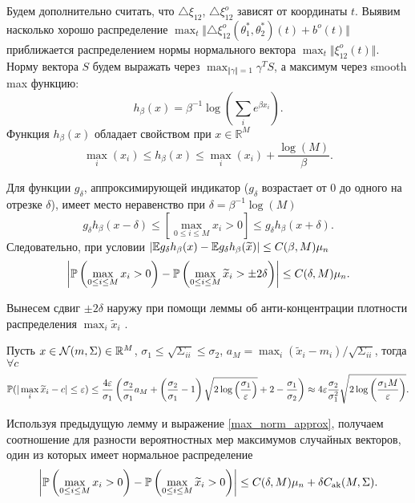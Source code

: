 Будем дополнительно считать, что $\triangle \xi_{12}$, $\triangle \xi_{12}^{o}$  зависят от координаты $t$. Выявим насколько хорошо распределение  $\max_{t}\Vert \triangle \xi_{12}^{o}(\theta_1^*, \theta_2^*)(t) + b^o(t) \Vert $ приближается распределением нормы нормального вектора $\max_{t}\Vert  \xi_{12}^{o}(t)\Vert $. Норму вектора $S$ будем выражать через $\max_{\Vert\gamma \Vert = 1} \gamma^T S$, а максимум через smooth max функцию:
\[
h_\beta (x) = \beta^{-1} \log\left( \sum_{i} e^{\beta x_i} \right) .
\]
Функция $h_\beta (x)$ обладает свойством при $x \in \mathbb{R}^M$
\[
 \max_i(x_i)  \leq  h_\beta (x) \leq \max_i(x_i)  +  \frac{\log(M)}{\beta}.
\] 
\begin{lemma}
Для функции $g_{\delta}$, аппроксимирующей индикатор ($g_{\delta}$ возрастает от 0 до одного на отрезке ${\delta}$),   имеет место неравенство при $\delta = \beta^{-1} \log(M)$
\[
g_{\delta} h_\beta (x - \delta) \leq \left[\max_{0\leq i \leq M} x_i > 0 \right]  \leq g_{\delta} h_\beta (x + \delta).
\]
Следовательно, при условии $\vert \mathrm{{\mathbb E}} g_{\delta} h_\beta(x)  -  \mathrm{{\mathbb E}} g_{\delta} h_\beta(\widetilde{x}) \vert \leq C(\beta, M) \mu_n$
\begin{equation}
\label{max_norm_approx}
\left| \mathrm{{\mathbb P}} \left(\max_{0\leq i \leq M} x_i > 0 \right)  -  \mathrm{{\mathbb P}}  \left(\max_{0\leq i \leq M} \widetilde{x}_i > \pm 2\delta \right) \right| \leq 
C(\delta, M) \mu_n.
\end{equation}
\end{lemma}

Вынесем сдвиг $\pm 2\delta$ наружу при помощи леммы об анти-концентрации  плотности распределения $\max_{i} \widetilde{x}_i$ .
 
\begin{lemma}
Пусть $x \in \mathrm{{\mathcal N}} (m, \Sigma) \in \mathbb{R}^M $,  $\sigma_1 \leq  \sqrt{\Sigma_{ii}} \leq  \sigma_2$, $a_M = \max_i (\widetilde{x}_i - m_i) /\sqrt{ \Sigma_{ii}}$, тогда $\forall c$
 \[
 \mathrm{{\mathbb P}}(\vert \max_{i} \widetilde{x}_i - c \vert \leq  \varepsilon)
 \leq \frac{4 \varepsilon}{\sigma_1} \left( \frac{\sigma_2}{\sigma_1} a_M +  \left(\frac{\sigma_2}{\sigma_1} - 1\right) \sqrt{2 \log \left(\frac{\sigma_1}{\varepsilon} \right)}+2  - \frac{\sigma_1}{\sigma_2}\right) \approx 4 \varepsilon \frac{\sigma_2}{\sigma_1^2} \sqrt{2 \log \left(  \frac{ \sigma_1 M}{\varepsilon} \right)}.
 \]
\end{lemma}
Используя предыдущую лемму и выражение \ref{max_norm_approx}, получаем соотношение для разности вероятностных мер максимумов случайных векторов, один из которых имеет нормальное распределение 
\begin{equation}
\label{max_norm_approx_1}
\left| \mathrm{{\mathbb P}} \left(\max_{0\leq i \leq M} x_i > 0 \right)  -  \mathrm{{\mathbb P}}  \left(\max_{0\leq i \leq M} \widetilde{x}_i > 0 \right) \right| \leq 
C(\delta, M) \mu_n +  \delta C_{\text{ak}}(M, \Sigma).
\end{equation}


